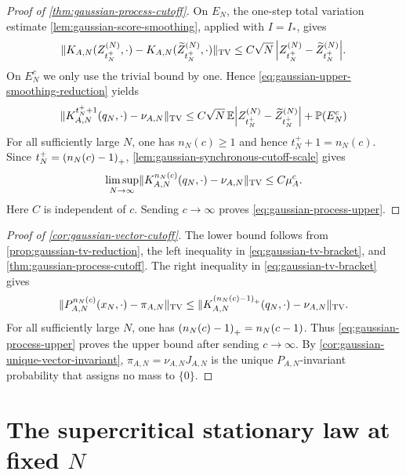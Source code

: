 \documentclass[11pt,reqno,a4paper]{article}
\newcommand{\Pp}{\P}
\newcommand{\Ee}{\E}
\newcommand{\TV}{\mathrm{TV}}
\begin{document}
\begin{proof}[Proof of \cref{thm:gaussian-process-cutoff}]
  On $E_N$, the one-step total variation estimate
  \cref{lem:gaussian-score-smoothing}, applied with $I=I_\ast$, gives
  \begin{equation*}
    \norm{
      K_{A,N}(Z_{t_N^+}^{(N)},\cdot)
      -
      K_{A,N}(\widetilde Z_{t_N^+}^{(N)},\cdot)
    }_{\TV}
    \leq
    C\sqrt N\,
    \abs{Z_{t_N^+}^{(N)}-\widetilde Z_{t_N^+}^{(N)}}.
  \end{equation*}
  On $E_N^c$ we only use the trivial bound by one. Hence
  \cref{eq:gaussian-upper-smoothing-reduction} yields
  \begin{equation*}
    \norm{
      K_{A,N}^{t_N^++1}(q_N,\cdot)-\nu_{A,N}
    }_{\TV}
    \leq
    C\sqrt N\,
    \Ee\abs{
      Z_{t_N^+}^{(N)}
      -
      \widetilde Z_{t_N^+}^{(N)}
    }
    +
    \Pp(E_N^c)
  \end{equation*}
  For all sufficiently large $N$, one has $n_N(c)\geq1$ and hence
  $t_N^++1=n_N(c)$. Since $t_N^+=\pospart{n_N(c)-1}$,
  \cref{lem:gaussian-synchronous-cutoff-scale} gives
  \begin{equation*}
    \limsup_{N\to\infty}
    \norm{
      K_{A,N}^{n_N(c)}(q_N,\cdot)-\nu_{A,N}
    }_{\TV}
    \leq
    C\mu_A^c.
  \end{equation*}
  Here $C$ is independent of $c$.
  Sending $c\to\infty$ proves
  \cref{eq:gaussian-process-upper}.
\end{proof}

\begin{proof}[Proof of \cref{cor:gaussian-vector-cutoff}]
  The lower bound follows from \cref{prop:gaussian-tv-reduction}, the left inequality in
  \cref{eq:gaussian-tv-bracket}, and \cref{thm:gaussian-process-cutoff}. The
  right inequality in \cref{eq:gaussian-tv-bracket} gives
  \begin{equation*}
    \norm{P_{A,N}^{n_N(c)}(x_N,\cdot)-\pi_{A,N}}_{\TV}
    \leq
    \norm{K_{A,N}^{\pospart{n_N(c)-1}}(q_N,\cdot)-\nu_{A,N}}_{\TV}.
  \end{equation*}
  For all sufficiently large $N$, one has
  $\pospart{n_N(c)-1}=n_N(c-1)$.
  Thus \cref{eq:gaussian-process-upper} proves the upper bound after sending
  $c\to\infty$. By \cref{cor:gaussian-unique-vector-invariant},
  $\pi_{A,N}=\nu_{A,N}J_{A,N}$ is the unique $P_{A,N}$-invariant probability
  that assigns no mass to $\{0\}$.
\end{proof}


\section{The supercritical stationary law at fixed \texorpdfstring{$N$}{N}}
\label{sec:nd-supercritical-stationary}
\end{document}
